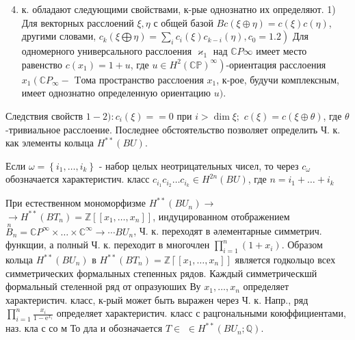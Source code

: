\documentclass[10pt]{article}
\begin{document}
\begin{enumerate}

  \setcounter{enumi}{3}

  \item к. обладают следующими свойствами, к-рые однознатно их определяют. 1) Для векторных расслоений $\xi, \eta$ с общей базой $B c(\xi \oplus \eta)=c(\xi) c(\eta)$, другими словами, $\left.c_{k}(\xi \bigoplus \eta)=\sum_{i} c_{i}(\xi) c_{k-i}(\eta), c_{0}=1.2\right)$ Для одномерного универсального расслоения $\varkappa_{1}$ над $\mathbb{C} P \infty$ имеет место равенство $c\left(x_{1}\right)=1+u$, где $\left.u \in H^{2}(\mathbb{C P})^{\infty}\right)$-ориентация расслоения $x_{1}\left(\mathbb{C} P_{\infty}-\right.$ Tома пространство расслоения $x_{1}$, к-рое, будучи комплексным, имеет однознатно определенную ориентацию $u)$.

\end{enumerate}



Следствия свойств $1-2): c_{i}(\xi)==0$ при $i>\operatorname{dim} \xi ;$ $c(\xi)=c(\xi \oplus \theta)$, где $\theta$-тривиальное расслоение. Последнее обстоятельство позволяет определить Ч. к. как элементы колыца $H^{* *}(B U)$.



Если $\omega=\left\{i_{1}, \ldots, i_{k}\right\}$ - набор целых неотрицательных чисел, то через $c_{\omega}$ обозначается характеристич. класс $c_{i_{1}} c_{i_{2}} \ldots c_{i_{k}} \in H^{2 n}(B U)$, где $n=i_{1}+\ldots+i_{k}$



При естественном мономорфизме $H^{* *}\left(B U_{n}\right) \rightarrow$ $\longrightarrow H^{* *}\left(B T_{n}\right)=\mathbb{Z}\left[\left[x_{1}, \ldots, x_{n}\right]\right]$, индуцированном отображением $\stackrel{n}{B}_{n}=\mathbb{C} P^{\infty} \times \ldots \times \mathbb{C}^{\infty} \rightarrow \cdots B U_{n}$, Ч. к. переходят в әлементарные симметрич. функщии, а полный Ч. к. переходит в многочлен $\prod_{i=1}^{n}\left(1+x_{i}\right)$. Образом кольца $H^{* *}\left(B U_{n}\right)$ в $H^{* *}\left(B T_{n}\right)=\mathbb{Z}\left\lceil\left[x_{1}, \ldots, x_{n}\right]\right]$ является годкольцо всех симметрических формалыных степенных рядов. Каждый симметрическшй формальный стеленной ряд от опразуюших Ву $x_{1}, \ldots, x_{n}$ определяет характеристич. класс, к-рый может быть выражен через Ч. к. Напр., ряд $\prod_{i=1}^{n} \frac{x_{i}}{1-\mathrm{e}^{x_{i}}}$ определяет характеристич. класс с рацгональными коюффициентами, наз. кла с со м То дла и обозначается $T \in$ $\in H^{* *}\left(B U_{n} ; \mathbb{Q}\right)$.
\end{document}

